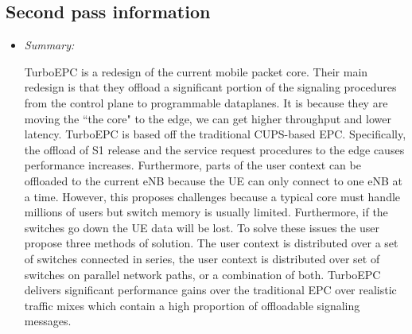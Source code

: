 \documentclass[letterpaper,twocolumn,10pt]{article}
\begin{document}
\subsection{Second pass information}
\label{sec:second}

\begin{itemize}

\item {\it Summary:} 

TurboEPC is a redesign of the current mobile packet core. Their main redesign is that they offload a significant 
portion of the signaling procedures from the control plane to programmable dataplanes. It is because they are 
moving the ``the core" to the edge, we can get higher throughput and lower latency. TurboEPC is based off the
traditional CUPS-based EPC. Specifically, the offload of S1 release and the service request procedures to the
edge causes performance increases. Furthermore, parts of the user context can be offloaded to the current
eNB because the UE can only connect to one eNB at a time. However, this proposes challenges because 
a typical core must handle millions of users but switch memory is usually limited. Furthermore, if the switches
go down the UE data will be lost. To solve these issues the user propose three methods of solution. The user
context is distributed over a set of switches connected in series, the user context is distributed over set of switches
on parallel network paths, or a combination of both. TurboEPC delivers significant performance gains over the traditional
EPC over realistic traffic mixes which contain a high proportion of offloadable signaling messages. 

\end{itemize}
\end{document}
